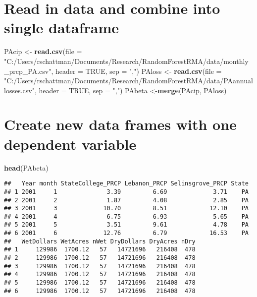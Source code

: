 \documentclass[]{article}
\newenvironment{Shaded}{\begin{snugshade}}{\end{snugshade}}
\newcommand{\KeywordTok}[1]{\textcolor[rgb]{0.13,0.29,0.53}{\textbf{{#1}}}}
\newcommand{\DataTypeTok}[1]{\textcolor[rgb]{0.13,0.29,0.53}{{#1}}}
\newcommand{\StringTok}[1]{\textcolor[rgb]{0.31,0.60,0.02}{{#1}}}
\newcommand{\OtherTok}[1]{\textcolor[rgb]{0.56,0.35,0.01}{{#1}}}
\newcommand{\NormalTok}[1]{{#1}}
\begin{document}
\section{Read in data and combine into single
dataframe}\label{read-in-data-and-combine-into-single-dataframe}

\begin{Shaded}
\begin{Highlighting}[]
\NormalTok{PAcip <-}\StringTok{ }\KeywordTok{read.csv}\NormalTok{(}\DataTypeTok{file =} \StringTok{"C:/Users/rschattman/Documents/Research/RandomForestRMA/data/monthly_prcp_PA.csv"}\NormalTok{, }\DataTypeTok{header =} \OtherTok{TRUE}\NormalTok{, }\DataTypeTok{sep =} \StringTok{","}\NormalTok{)}
\NormalTok{PAloss <-}\StringTok{ }\KeywordTok{read.csv}\NormalTok{(}\DataTypeTok{file =} \StringTok{"C:/Users/rschattman/Documents/Research/RandomForestRMA/data/PAannuallosses.csv"}\NormalTok{, }\DataTypeTok{header =} \OtherTok{TRUE}\NormalTok{, }\DataTypeTok{sep =} \StringTok{","}\NormalTok{)}
\NormalTok{PAbeta <-}\KeywordTok{merge}\NormalTok{(PAcip, PAloss)}
\end{Highlighting}
\end{Shaded}

\section{Create new data frames with one dependent
variable}\label{create-new-data-frames-with-one-dependent-variable}

\begin{Shaded}
\begin{Highlighting}[]
\KeywordTok{head}\NormalTok{(PAbeta)}
\end{Highlighting}
\end{Shaded}

\begin{verbatim}
##   Year month StateCollege_PRCP Lebanon_PRCP Selinsgrove_PRCP State
## 1 2001     1              3.39         6.69             3.71    PA
## 2 2001     2              1.87         4.08             2.85    PA
## 3 2001     3             10.70         8.51            12.10    PA
## 4 2001     4              6.75         6.93             5.65    PA
## 5 2001     5              3.51         9.61             4.78    PA
## 6 2001     6             12.76         6.79            16.53    PA
##   WetDollars WetAcres nWet DryDollars DryAcres nDry
## 1     129986  1700.12   57   14721696   216408  478
## 2     129986  1700.12   57   14721696   216408  478
## 3     129986  1700.12   57   14721696   216408  478
## 4     129986  1700.12   57   14721696   216408  478
## 5     129986  1700.12   57   14721696   216408  478
## 6     129986  1700.12   57   14721696   216408  478
\end{verbatim}
\end{document}
